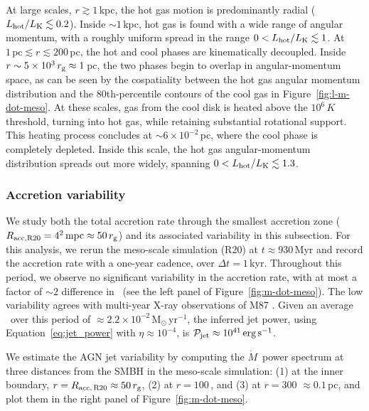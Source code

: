 At large scales, $r\gtrsim 1$\,kpc, the hot gas motion is predominantly radial ($L_{\rm hot}/L_{\rm K} \lesssim 0.2$).
Inside $\sim 1$\,kpc, hot gas is found with a wide range of angular momentum, with a roughly uniform spread in the range $0 < L_{\rm hot}/L_{\rm K} \lesssim 1$.
At $1\,\mathrm{pc} \lesssim r \lesssim 200$\,pc, the hot and cool phases are kinematically decoupled.
Inside $r \sim 5\times10^3\,r_{\rm g} \approx 1\,$pc, the two phases begin to overlap in angular-momentum space, as can be seen by the cospatiality between the hot gas angular momentum distribution and the 80th-percentile contours of the cool gas in Figure~\ref{fig:l-m-dot-meso}.
At these scales, gas from the cool disk is heated above the $10^6\,K$ threshold, turning into hot gas, while retaining substantial rotational support.
This heating process concludes at $\sim 6\times10^{-2}\,$pc, where the cool phase is completely depleted.
Inside this scale, the hot gas angular-momentum distribution spreads out more widely, spanning $0 < L_{\rm hot}/L_{\rm K} \lesssim 1.3$.

\subsubsection{Accretion variability} \label{subsec:variability}

We study both the total accretion rate through the smallest accretion zone ($R_{\rm acc,R20}=4^2\,\mathrm{mpc}\approx 50\,r_{\rm g}$) and its associated variability in this subsection. For this analysis, we rerun the meso-scale simulation (R20) at $t\approx930$\,Myr and record the accretion rate with a one-year cadence, over $\Delta t = 1$\,kyr.
Throughout this period, we observe no significant variability in the accretion rate, with at most a factor of $\sim 2$ difference in \mdotbh\ (see the left panel of Figure~\ref{fig:m-dot-meso}).
The low variability agrees with multi-year X-ray observations of M87 \citep[][]{prieto_central_2016,cheng_year-scale_2023}.
Given an average \mdotbh\ over this period of $\approx 2.2\times10^{-2}\, \mathrm{M_{\odot}\,yr^{-1}}$, the inferred jet power, using Equation~\ref{eq:jet_power} with $\eta \approx 10^{-4}$, is $\mathcal{P}_{\rm jet} \approx 10^{41}\,\mathrm{erg\,s^{-1}}$.

We estimate the AGN jet variability by computing the $\dot{M}$\ power spectrum at three distances from the SMBH in the meso-scale simulation: (1) at the inner boundary, $r = R_{\rm acc,\,R20}\approx 50\,r_{\rm g}$, (2) at $r = 100$\,\rg, and (3) at $r = 300$\,\rg\,$\approx 0.1\,$pc, and plot them in the right panel of Figure~\ref{fig:m-dot-meso}.

